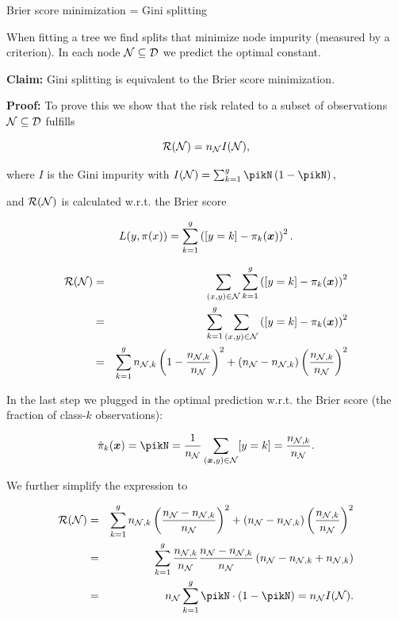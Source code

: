 \begin{vbframe}{Brier score minimization = Gini splitting}

When fitting a tree we find splits that minimize node impurity (measured by a criterion). In each node $\mathcal{N} \subseteq \mathcal{D}$ we predict the optimal constant. 

\vspace*{0.2cm}

\textbf{Claim:} Gini splitting is equivalent to the Brier score minimization. 

\vspace*{0.2cm}

\textbf{Proof: } To prove this we show that the risk related to a subset of observations $\mathcal{N} \subseteq \mathcal{D}$ fulfills 


$$
  \mathcal{R}(\mathcal{N}) = n_{\mathcal{N}} I(\mathcal{N}),
$$
  
  where $I$ is the Gini impurity with $I(\Np) = \sum_{k=1}^g \pikN \left(1-\pikN \right),$

and $\mathcal{R}(\mathcal{N})$ is calculated w.r.t. the Brier score

$$
  L(y, \pi(x)) = \sum_{k = 1}^g \left([y = k] - \pi_k(\bm{x})\right)^2.
$$

\framebreak


\begin{eqnarray*}
\mathcal{R}(\mathcal{N}) &=& \sum_{(x, y) \in \mathcal{N}}  \sum_{k = 1}^g \left([y = k] - \pi_k(\bm{x})\right)^2 \\
&=& \sum_{k = 1}^g \sum_{(x, y) \in \mathcal{N}}   \left([y = k] - \pi_k(\bm{x})\right)^2 \\
&=& \sum_{k = 1}^g n_{\mathcal{N},k}\left(1 - \frac{n_{\mathcal{N},k}}{n_{\mathcal{N} }}\right)^2 + (n_{\mathcal{N} } - n_{\mathcal{N},k})\left(\frac{n_{\mathcal{N},k}}{n_{\mathcal{N} }}\right)^2
\end{eqnarray*}


In the last step we plugged in the optimal prediction w.r.t. the Brier score (the fraction of class-$k$ observations):

$$\hat \pi_k(\xv)= \pikN = \frac{1}{n_{\Np}} \sum\limits_{(\xv,y) \in \Np} [y = k] = \frac{n_{\Np,k}}{n_{\Np }}.$$ 


We further simplify the expression to

\begin{eqnarray*}
\risk(\Np) &=&  \sum_{k = 1}^g n_{\Np,k}\left(\frac{n_{\Np } - n_{\Np,k}}{n_{\Np }}\right)^2 + (n_{\Np } - n_{\Np,k})\left(\frac{n_{\Np,k}}{n_{\Np }}\right)^2 \\
&=& \sum_{k = 1}^g \frac{n_{\Np,k}}{n_{\Np }} \frac{n_{\Np } - n_{\Np,k}}{n_{\Np }} \left(n_{\Np } - n_{\Np,k } + n_{\Np,k}\right) \\
&=& n_{\Np } \sum_{k = 1}^g \pikN \cdot \left(1 - \pikN \right) = n_\Np I(\Np).
\end{eqnarray*}

\end{vbframe}


\endlecture

